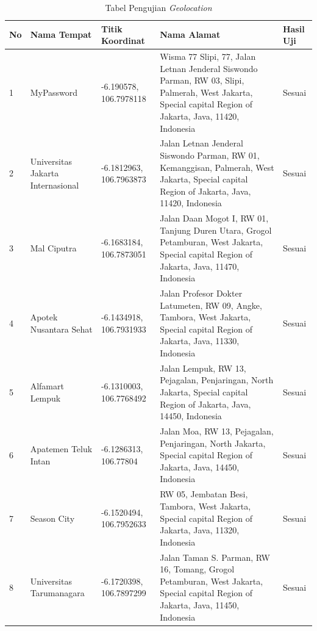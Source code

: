 \begin{longtable}{ |p{0.5cm}|p{2cm}|p{2.5cm}|p{6cm}|p{1cm}|}
\caption{Tabel Pengujian \textit{Geolocation}}\label{tab:table-pengujian-geolocation} 
\\
\hline
\textbf{No}
&\textbf{Nama Tempat}
&\textbf{Titik Koordinat}
&\textbf{Nama Alamat}
&\textbf{Hasil Uji}
\\ 
\hline

\multirow{1}{*}{1}
&MyPassword
&-6.190578, 106.7978118
&Wisma 77 Slipi, 77, Jalan Letnan Jenderal Siswondo Parman, RW 03, Slipi, Palmerah, West Jakarta, Special capital Region of Jakarta, Java, 11420, Indonesia
&Sesuai
\\
\hline

\multirow{1}{*}{2}
&Universitas Jakarta Internasional
&-6.1812963, 106.7963873
&Jalan Letnan Jenderal Siswondo Parman, RW 01, Kemanggisan, Palmerah, West Jakarta, Special capital Region of Jakarta, Java, 11420, Indonesia
&Sesuai
\\
\hline

\multirow{1}{*}{3}
&Mal Ciputra
&-6.1683184, 106.7873051
&Jalan Daan Mogot I, RW 01, Tanjung Duren Utara, Grogol Petamburan, West Jakarta, Special capital Region of Jakarta, Java, 11470, Indonesia
&Sesuai
\\
\hline

\multirow{1}{*}{4}
&Apotek Nusantara Sehat
&-6.1434918, 106.7931933
&Jalan Profesor Dokter Latumeten, RW 09, Angke, Tambora, West Jakarta, Special capital Region of Jakarta, Java, 11330, Indonesia
&Sesuai
\\
\hline

\multirow{1}{*}{5}
&Alfamart Lempuk
&-6.1310003, 106.7768492
&Jalan Lempuk, RW 13, Pejagalan, Penjaringan, North Jakarta, Special capital Region of Jakarta, Java, 14450, Indonesia
&Sesuai
\\
\hline

\multirow{1}{*}{6}
&Apatemen Teluk Intan
&-6.1286313, 106.77804
&Jalan Moa, RW 13, Pejagalan, Penjaringan, North Jakarta, Special capital Region of Jakarta, Java, 14450, Indonesia
&Sesuai
\\
\hline

\multirow{1}{*}{7}
&Season City
&-6.1520494, 106.7952633
&RW 05, Jembatan Besi, Tambora, West Jakarta, Special capital Region of Jakarta, Java, 11320, Indonesia
&Sesuai
\\
\hline

\multirow{1}{*}{8}
&Universitas Tarumanagara
&-6.1720398, 106.7897299
&Jalan Taman S. Parman, RW 16, Tomang, Grogol Petamburan, West Jakarta, Special capital Region of Jakarta, Java, 11450, Indonesia
&Sesuai
\\
\hline


\end{longtable}
